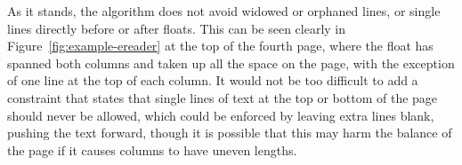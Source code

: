 As it stands, the algorithm does not avoid widowed or orphaned lines, or single lines directly before or after floats. This can be seen clearly in Figure~\ref{fig:example-ereader} at the top of the fourth page, where the float has spanned both columns and taken up all the space on the page, with the exception of one line at the top of each column. It would not be too difficult to add a constraint that states that single lines of text at the top or bottom of the page should never be allowed, which could be enforced by leaving extra lines blank, pushing the text forward, though it is possible that this may harm the balance of the page if it causes columns to have uneven lengths.

\begin{figure}
\begin{center}
\hspace{0.01\textwidth}


\end{center}
\end{figure}
